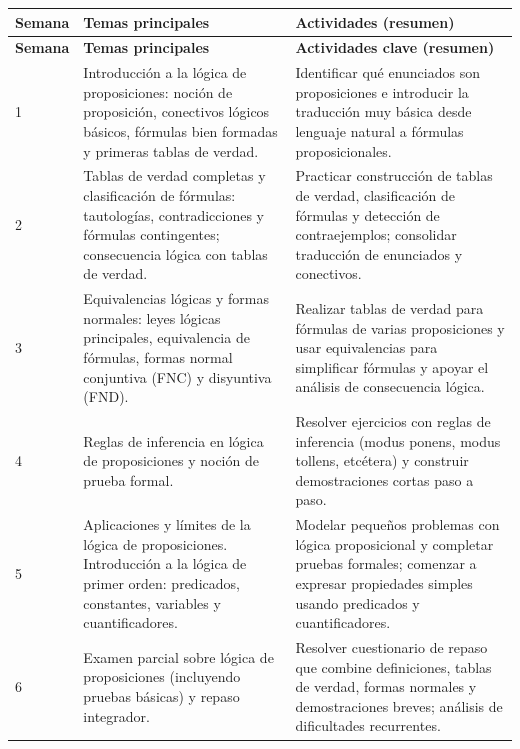 \documentclass[12pt]{article}
\begin{document}
\setlength{\extrarowheight}{2pt}
\begin{longtable}{|>{\centering\arraybackslash}p{1.2cm}|p{7.2cm}|p{7.2cm}|}
	\hline
	\textbf{Semana} & \textbf{Temas principales} & \textbf{Actividades (resumen)} \\
	\hline
	\endfirsthead
	\hline
	\textbf{Semana} & \textbf{Temas principales} & \textbf{Actividades clave (resumen)} \\
	\hline
	\endhead
	
	1 & 
	Introducción a la lógica de proposiciones: noción de proposición, conectivos lógicos básicos, fórmulas bien formadas y primeras tablas de verdad. &
	Identificar qué enunciados son proposiciones e introducir la traducción muy básica desde lenguaje natural a fórmulas proposicionales. \\
	\hline
	
	2 &
	Tablas de verdad completas y clasificación de fórmulas: tautologías, contradicciones y fórmulas contingentes; consecuencia lógica con tablas de verdad. &
	Practicar construcción de tablas de verdad, clasificación de fórmulas y detección de contraejemplos; consolidar traducción de enunciados y conectivos. \\
	\hline
	
	3 &
	Equivalencias lógicas y formas normales: leyes lógicas principales, equivalencia de fórmulas, formas normal conjuntiva (FNC) y disyuntiva (FND). &
	Realizar tablas de verdad para fórmulas de varias proposiciones y usar equivalencias para simplificar fórmulas y apoyar el análisis de consecuencia lógica. \\
	\hline
	
	4 &
	Reglas de inferencia en lógica de proposiciones y noción de prueba formal. &
	Resolver ejercicios con reglas de inferencia (modus ponens, modus tollens, etcétera) y construir demostraciones cortas paso a paso. \\
	\hline
	
	5 &
	Aplicaciones y límites de la lógica de proposiciones. Introducción a la lógica de primer orden: predicados, constantes, variables y cuantificadores. &
	Modelar pequeños problemas con lógica proposicional y completar pruebas formales; comenzar a expresar propiedades simples usando predicados y cuantificadores. \\
	\hline
	
	6 &
	Examen parcial sobre lógica de proposiciones (incluyendo pruebas básicas) y repaso integrador. &
	Resolver cuestionario de repaso que combine definiciones, tablas de verdad, formas normales y demostraciones breves; análisis de dificultades recurrentes. \\
	\hline
	

\end{longtable}
\end{document}
